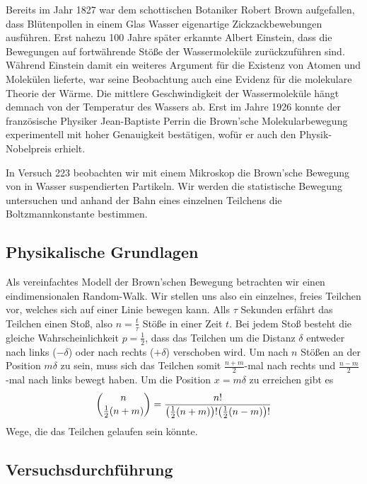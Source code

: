 Bereits im Jahr 1827 war dem schottischen Botaniker Robert Brown aufgefallen, dass Blütenpollen in einem Glas Wasser eigenartige Zickzackbewebungen ausführen. Erst nahezu 100 Jahre später erkannte Albert Einstein, dass die Bewegungen auf fortwährende Stöße der Wassermoleküle zurückzuführen sind. Während Einstein damit ein weiteres Argument für die Existenz von Atomen und Molekülen lieferte, war seine Beobachtung auch eine Evidenz für die molekulare Theorie der Wärme. Die mittlere Geschwindigkeit der Wassermoleküle hängt demnach von der Temperatur des Wassers ab. Erst im Jahre 1926 konnte der französische Physiker Jean-Baptiste Perrin die Brown'sche Molekularbewegung experimentell mit hoher Genauigkeit bestätigen, wofür er auch den Physik-Nobelpreis erhielt.

In Versuch 223 beobachten wir mit einem Mikroskop die Brown'sche Bewegung von in Wasser suspendierten Partikeln. Wir werden die statistische Bewegung untersuchen und anhand der Bahn eines einzelnen Teilchens die Boltzmannkonstante bestimmen.

\subsection{Physikalische Grundlagen}

Als vereinfachtes Modell der Brown'schen Bewegung betrachten wir einen eindimensionalen Random-Walk. Wir stellen uns also ein einzelnes, freies Teilchen vor, welches sich auf einer Linie bewegen kann. Alls $\tau$ Sekunden erfährt das Teilchen einen Stoß, also $n = \frac{t}{\tau}$ Stöße in einer Zeit $t$. Bei jedem Stoß besteht die gleiche Wahrscheinlichkeit $p = \frac{1}{2}$, dass das Teilchen um die Distanz $\delta$ entweder nach links ($-\delta$) oder nach rechts ($+\delta$) verschoben wird. Um nach $n$ Stößen an der Position $m\delta$ zu sein, muss sich das Teilchen somit $\frac{n+m}{2}$-mal nach rechts und $\frac{n-m}{2}$-mal nach links bewegt haben. Um die Position $x = m\delta$ zu erreichen gibt es
\begin{align}
  \binom{n}{\frac{1}{2}(n+m)} = \frac{n!}{\qty(\frac{1}{2}(n+m))!\qty(\frac{1}{2}(n-m))!}
\end{align}
Wege, die das Teilchen gelaufen sein könnte.

\subsection{Versuchsdurchführung}



